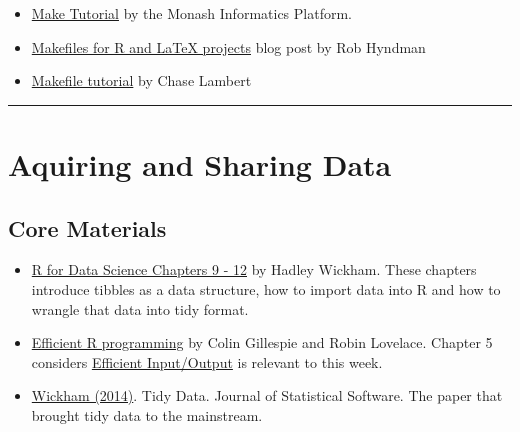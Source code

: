 \documentclass[
  letterpaper,
  DIV=11,
  numbers=noendperiod]{scrreprt}
\providecommand{\tightlist}{%
  \setlength{\itemsep}{0pt}\setlength{\parskip}{0pt}}\usepackage{longtable,booktabs,array}
\begin{document}
\begin{itemize}
\tightlist
\item
  \href{https://monashbioinformaticsplatform.github.io/2017-11-16-open-science-training/topics/automation.html}{Make
  Tutorial} by the Monash Informatics Platform.
\end{itemize}

\begin{itemize}
\tightlist
\item
  \href{https://robjhyndman.com/hyndsight/makefiles/}{Makefiles for R
  and LaTeX projects} blog post by Rob Hyndman
\end{itemize}

\begin{itemize}
\tightlist
\item
  \href{https://makefiletutorial.com/\#getting-started}{Makefile
  tutorial} by Chase Lambert
\end{itemize}

\begin{center}\rule{0.5\linewidth}{0.5pt}\end{center}

\section{Aquiring and Sharing Data}\label{data-reading}

\subsection*{Core Materials}\label{core-materials-1}

\begin{itemize}
\item
  \href{https://r4ds.had.co.nz/tidy-data.html}{R for Data Science
  Chapters 9 - 12} by Hadley Wickham. These chapters introduce tibbles
  as a data structure, how to import data into R and how to wrangle that
  data into tidy format.
\item
  \href{https://csgillespie.github.io/efficientR/}{Efficient R
  programming} by Colin Gillespie and Robin Lovelace. Chapter 5
  considers
  \href{https://csgillespie.github.io/efficientR/input-output.html}{Efficient
  Input/Output} is relevant to this week.
\item
  \href{https://vita.had.co.nz/papers/tidy-data.html}{Wickham (2014)}.
  Tidy Data. Journal of Statistical Software. The paper that brought
  tidy data to the mainstream.
\end{itemize}
\end{document}
